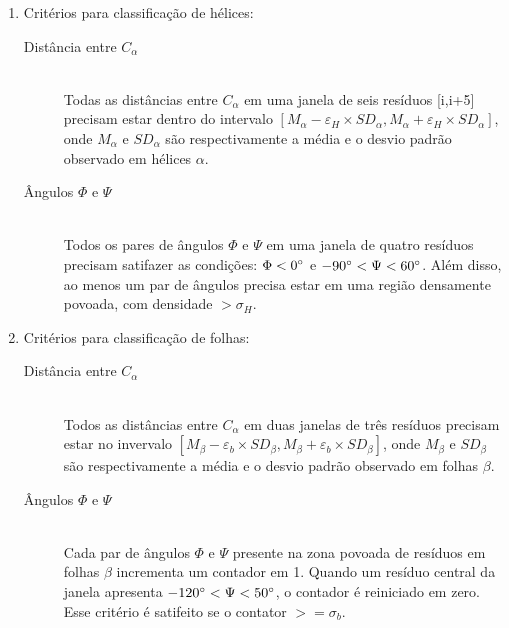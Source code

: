 \begin{enumerate}

\item Critérios para classificação de hélices:

\begin{description}

\item [Distância entre $C_\alpha$] \hfill \\
Todas as distâncias entre $C_\alpha$ em uma janela de seis resíduos [i,i+5] precisam estar dentro do intervalo $[M_\alpha - \varepsilon_H \times SD_\alpha, M_\alpha + \varepsilon_H \times SD_\alpha]$, onde $M_\alpha$ e $SD_\alpha$ são respectivamente a média e o desvio padrão observado em hélices $\alpha$.

\item [Ângulos $\Phi$ e $\Psi$] \hfill \\
Todos os pares de ângulos $\Phi$ e $\Psi$ em uma janela de quatro resíduos precisam satifazer as condições:  $\Phi < 0\degree$ e $-90\degree < \Psi < 60\degree$. Além disso, ao menos um par de ângulos precisa estar em uma região densamente povoada, com densidade $> \sigma_H$.

\end{description}

\item Critérios para classificação de folhas:

\begin{description}

\item [Distância entre $C_\alpha$] \hfill \\
Todos as distâncias entre $C_\alpha$ em duas janelas de três resíduos precisam estar no invervalo $[M_\beta - \varepsilon_b \times SD_\beta, M_\beta + \varepsilon_b \times SD_\beta]$, onde $M_\beta$ e $SD_\beta$ são respectivamente a média e o desvio padrão observado em folhas $\beta$.

\item [Ângulos $\Phi$ e $\Psi$] \hfill \\
Cada par de ângulos $\Phi$ e $\Psi$ presente na zona povoada de resíduos em folhas $\beta$ incrementa um contador em 1. Quando um resíduo central da janela apresenta $-120\degree < \Psi < 50\degree$, o contador é reiniciado em zero. Esse critério é satifeito se o contator $>= \sigma_b$.

\end{description}

\end{enumerate}

